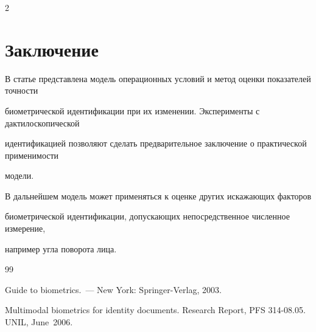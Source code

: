 \begin{multicols}{2}





\section{Заключение}





В статье представлена модель операционных условий и метод оценки показателей точности 


биометрической идентификации при их изменении. Эксперименты с дактилоскопической 


идентификацией позволяют сделать предварительное заключение о практической применимости 


модели. 





В дальнейшем модель может применяться к оценке других искажающих факторов 


биометрической идентификации, допускающих непосредственное численное измерение, 


например угла поворота лица.








{\small\frenchspacing


{%




\begin{thebibliography}{99}









Guide to biometrics.~--- New York: Springer-Verlag, 2003.









Multimodal biometrics for identity documents. Research Report, PFS 314-08.05. UNIL, June~2006.








\end{thebibliography}}}
\end{multicols}
